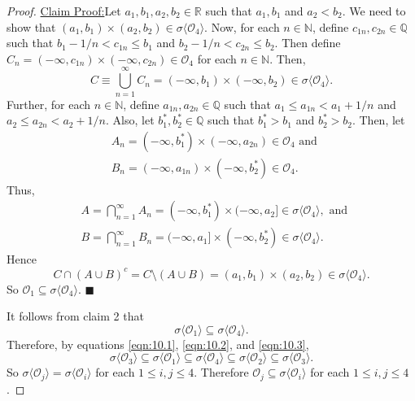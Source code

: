 \documentclass[12pt]{article}
\newenvironment{claimproof}[1]{\par\noindent\underline{Claim Proof:}\space#1}{\hfill $\blacksquare$}
\begin{document}
\begin{proof}
\begin{claimproof}
Let $a_{1}, b_{1}, a_{2}, b_{2} \in \mathbb{R}$ such that $a_{1}, b_{1}$ and $a_{2} < b_{2}$. We need to show that $(a_{1}, b_{1}) \times (a_{2},
b_{2}) \in \sigma\langle\mathcal{O}_{4}\rangle$. Now, for each $n \in \mathbb{N}$, define $c_{1n}, c_{2n} \in \mathbb{Q}$ such that $b_{1} - 1/n <
c_{1n} \leq b_{1}$ and $b_{2} - 1/n < c_{2n} \leq b_{2}$. Then define $C_{n} = (-\infty, c_{1n})\times (-\infty, c_{2n}) \in \mathcal{O}_{4}$ for each
$n \in \mathbb{N}$. Then,
\[ C \equiv \bigcup_{n=1}^{\infty}C_{n} = (-\infty, b_{1}) \times (-\infty, b_{2}) \in \sigma\langle\mathcal{O}_{4}\rangle. \]
Further, for each $n \in \mathbb{N}$, define $a_{1n}, a_{2n} \in \mathbb{Q}$ such that $a_{1} \leq a_{1n} < a_{1} + 1/n$ and $a_{2} \leq a_{2n} <
a_{2} + 1/n$. Also, let $b_{1}^{*}, b_{2}^{*} \in \mathbb{Q}$ such that $b_{1}^{*} > b_{1}$ and $b_{2}^{*} > b_{2}$. Then, let
\begin{align*}
& A_{n} = (-\infty, b_{1}^{*}) \times (-\infty, a_{2n}) \in \mathcal{O}_{4} \text{ and } \\
& B_{n} = (-\infty, a_{1n}) \times (-\infty, b_{2}^{*}) \in \mathcal{O}_{4}.
\end{align*}
Thus,
\begin{align*}
& A = \bigcap_{n=1}^{\infty}A_{n} = (-\infty, b_{1}^{*}) \times (-\infty, a_{2}] \in \sigma \langle \mathcal{O}_{4}\rangle, \text{ and } \\
& B = \bigcap_{n=1}^{\infty}B_{n} = (-\infty, a_{1}] \times (-\infty, b_{2}^{*}) \in \sigma \langle \mathcal{O}_{4}\rangle.
\end{align*}
Hence 
\[ C \cap (A\cup B)^{c} = C \setminus (A\cup B) = (a_{1}, b_{1}) \times (a_{2}, b_{2}) \in \sigma\langle\mathcal{O}_{4}\rangle. \]
So $\mathcal{O}_{1} \subseteq \sigma\langle\mathcal{O}_{4}\rangle$.
\end{claimproof}

It follows from claim 2 that 
\begin{equation}
\sigma\langle\mathcal{O}_{1}\rangle \subseteq \sigma\langle\mathcal{O}_{4}\rangle.
\label{eqn:10.3}
\end{equation}
Therefore, by equations \ref{eqn:10.1}, \ref{eqn:10.2}, and \ref{eqn:10.3}, 
\[ \sigma\langle\mathcal{O}_{3}\rangle \subseteq \sigma\langle\mathcal{O}_{1}\rangle \subseteq \sigma\langle\mathcal{O}_{4}\rangle \subseteq
\sigma\langle\mathcal{O}_{2}\rangle \subseteq \sigma\langle\mathcal{O}_{3}\rangle. \]
So $\sigma\langle\mathcal{O}_{j}\rangle = \sigma\langle\mathcal{O}_{i}\rangle$ for each $1 \leq i,j\leq 4$. Therefore $\mathcal{O}_{j} \subseteq
\sigma\langle\mathcal{O}_{i}\rangle$ for each $1 \leq i,j \leq 4$.
\end{proof}
\end{document}
